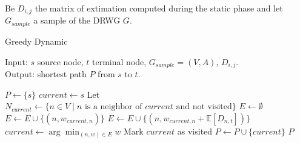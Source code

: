 Be $D_{i,j}$ the matrix of extimation computed during the static phase and let $G_{sample}$ a sample of the DRWG $G$. 


\begin{algorithm}
	\caption{Greedy Dynamic} 
    Input: $s$ source node, $t$ terminal node, $G_{sample} = (V,A)$, $D_{i,j}$.  \\
    Output: shortest path $P$ from $s$ to $t$.
	\begin{algorithmic}[1]
        \State $P \gets \{s\}$
        \State $current \gets s$
            \State Let $N_{current} \gets \{n \in V \mid n \text{ is a neighbor of } current \text{ and not visited}\}$
            \State $E \gets \emptyset$
                    \State $E \gets E \cup \{(n, w_{current,n})\}$
                \Else
                    \State $E \gets E \cup \{(n, w_{current,n} + \mathbb{E}[D_{n,t}])\}$
                \EndIf
            \EndFor
            \State $current \gets \arg\min_{(n,w) \in E} w$
            \State Mark $current$ as visited
            \State $P \gets P \cup \{current\}$
        \EndWhile
        \State \Return $P$
	\end{algorithmic} 
\end{algorithm}
